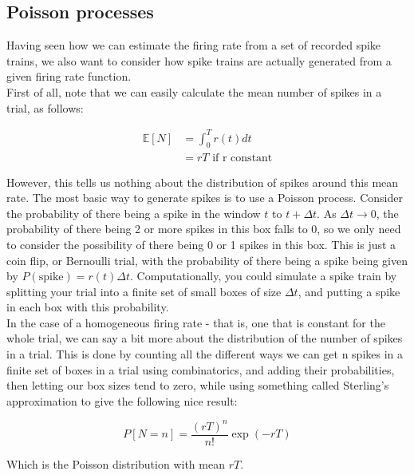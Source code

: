 \documentclass{article}
\begin{document}
\subsection{Poisson processes}

Having seen how we can estimate the firing rate from a set of recorded spike trains, we also want to consider how spike trains are actually generated from a given firing rate function.\\

First of all, note that we can easily calculate the mean number of spikes in a trial, as follows:

\begin{align*}
    \mathbb{E} [N] &= \int_0^T r(t)dt\\
    &= rT \text{ if r constant}
\end{align*}

However, this tells us nothing about the distribution of spikes around this mean rate. The most basic way to generate spikes is to use a Poisson process. Consider the probability of there being a spike in the window $t$ to $t+\Delta t$. As $\Delta t \to 0$, the probability of there being 2 or more spikes in this box falls to 0, so we only need to consider the possibility of there being 0 or 1 spikes in this box. This is just a coin flip, or Bernoulli trial, with the probability of there being a spike being given by $P(\text{spike})=r(t)\Delta t$. Computationally, you could simulate a spike train by splitting your trial into a finite set of small boxes of size $\Delta t$, and putting a spike in each box with this probability.\\

In the case of a homogeneous firing rate - that is, one that is constant for the whole trial, we can say a bit more about the distribution of the number of spikes in a trial. This is done by counting all the different ways we can get n spikes in a finite set of boxes in a trial using combinatorics, and adding their probabilities, then letting our box sizes tend to zero, while using something called Sterling's approximation to give the following nice result:

\begin{equation*}
    P[N=n] = \frac{(rT)^n}{n!} \exp(-rT)
\end{equation*}

Which is the Poisson distribution with mean $rT$.\\
\end{document}
